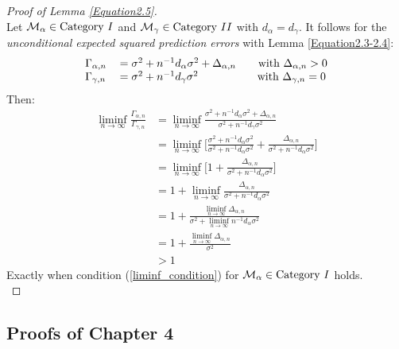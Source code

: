 \documentclass[Research_Module_ES.tex]{subfiles}
\begin{document}
\begin{proof}[Proof of Lemma \ref{Equation2.5}]~\\
	Let $\mathcal{M}_\alpha\in\text{Category}~\RM{1}$ and $\mathcal{M}_\gamma\in\text{Category}~\RM{2}$ with $d_\alpha=d_\gamma$. It follows for the \textit{unconditional expected squared prediction errors} with Lemma \ref{Equation2.3-2.4}:
	\begin{align*}
	\begin{tabular}{ll}
	$\Gamma_{\alpha,n}$&$=\sigma^2+n^{-1}d_\alpha\sigma^2+\Delta_{\alpha,n}~~~~~$ with $\Delta_{\alpha,n}>0$\\
	$\Gamma_{\gamma,n}$&$=\sigma^2+n^{-1}d_\gamma\sigma^2~~~~~~~~~~~~~~~~$with $\Delta_{\gamma,n}=0$
	\end{tabular}
	\end{align*}
	Then:
	\begin{align*}
	\liminf_{n\rightarrow\infty}\frac{\Gamma_{\alpha,n}}{\Gamma_{\gamma,n}}&=\liminf_{n\rightarrow\infty}\frac{\sigma^2+n^{-1}d_\alpha\sigma^2+\Delta_{\alpha,n}}{\sigma^2+n^{-1}d_\gamma\sigma^2}	\\
	&=\liminf_{n\rightarrow\infty}\Big[\frac{\sigma^2+n^{-1}d_\alpha\sigma^2}{\sigma^2+n^{-1}d_\alpha\sigma^2}+\frac{\Delta_{\alpha,n}}{\sigma^2+n^{-1}d_\alpha\sigma^2}\Big]\\
	&=\liminf_{n\rightarrow\infty}\Big[1+\frac{\Delta_{\alpha,n}}{\sigma^2+n^{-1}d_\alpha\sigma^2}\Big]\\
	&=1+\liminf_{n\rightarrow\infty}\frac{\Delta_{\alpha,n}}{\sigma^2+n^{-1}d_\alpha\sigma^2}\\
	&=1+\frac{\liminf_{n\rightarrow\infty}\Delta_{\alpha,n}}{\sigma^2+ \liminf_{n\rightarrow\infty} n^{-1}d_\alpha\sigma^2}\\
	&=1+\frac{\liminf_{n\rightarrow\infty}\Delta_{\alpha,n}}{\sigma^2}\\
	&>1
	\end{align*}
	Exactly when condition (\ref{liminf_condition}) for $\mathcal{M}_\alpha\in\text{Category}~\RM{1}$ holds.\\
\end{proof}

\subsection*{Proofs of Chapter 4}
\end{document}
